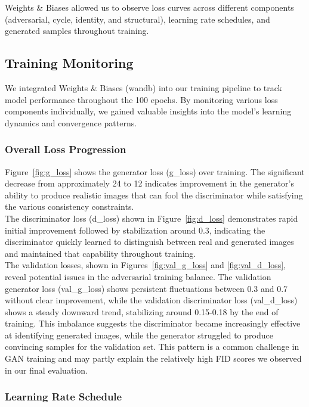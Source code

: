 \documentclass[twocolumn,superscriptaddress,aps]{revtex4-1}
\begin{document}
Weights \& Biases allowed us to observe loss curves across different components (adversarial, cycle, identity, and structural), learning rate schedules, and generated samples throughout training.

\subsection{Training Monitoring}

We integrated Weights \& Biases (wandb) into our training pipeline to track model performance throughout the 100 epochs. By monitoring various loss components individually, we gained valuable insights into the model's learning dynamics and convergence patterns.

\subsubsection{Overall Loss Progression}

Figure~\ref{fig:g_loss} shows the generator loss (g\_loss) over training. The significant decrease from approximately 24 to 12 indicates improvement in the generator's ability to produce realistic images that can fool the discriminator while satisfying the various consistency constraints. \\

The discriminator loss (d\_loss) shown in Figure~\ref{fig:d_loss} demonstrates rapid initial improvement followed by stabilization around 0.3, indicating the discriminator quickly learned to distinguish between real and generated images and maintained that capability throughout training. \\

The validation losses, shown in Figures~\ref{fig:val_g_loss} and \ref{fig:val_d_loss}, reveal potential issues in the adversarial training balance. The validation generator loss (val\_g\_loss) shows persistent fluctuations between 0.3 and 0.7 without clear improvement, while the validation discriminator loss (val\_d\_loss) shows a steady downward trend, stabilizing around 0.15-0.18 by the end of training. This imbalance suggests the discriminator became increasingly effective at identifying generated images, while the generator struggled to produce convincing samples for the validation set. This pattern is a common challenge in GAN training and may partly explain the relatively high FID scores we observed in our final evaluation.

\subsubsection{Learning Rate Schedule}
\end{document}
